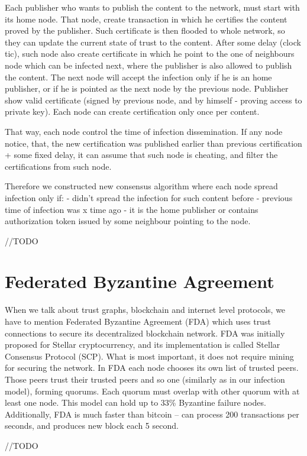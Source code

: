 \documentclass[nostrict]{szablonPG}
\begin{document}
Each publisher who wants to publish the content to the network, must start with its home node. That node, create transaction in which he certifies the content proved by the publisher. Such certificate is then flooded to whole network, so they can update the current state of trust to the content. After some delay (clock tic), such node also create certificate in which he point to the one of neighbours node which can be infected next, where the publisher is also allowed to publish the content. The next node will accept the infection only if he is an home publisher, or if he is pointed as the next node by the previous node. Publisher show valid certificate (signed by previous node, and by himself - proving access to private key). Each node can create certification only once per content. 

That way, each node control the time of infection dissemination. If any node notice, that, the new certification was published earlier than previous certification + some fixed delay, it can assume that such node is cheating, and filter the certifications from such node.

Therefore we constructed new consensus algorithm where each node spread infection only if:
- didn't spread the infection for such content before
- previous time of infection was x time ago
- it is the home publisher or contains authorization token issued by some neighbour pointing to the node.

//TODO

\section{Federated Byzantine Agreement}
When we talk about trust graphs, blockchain and internet level protocols, we have to mention Federated Byzantine Agreement (FDA) which uses trust connections to secure its decentralized blockchain network. FDA was initially proposed for Stellar cryptocurrency, and its implementation is called Stellar Consensus Protocol (SCP). What is most important, it does not require mining for securing the network. In FDA each node chooses its own list of trusted peers. Those peers trust their trusted peers and so one (similarly as in our infection model), forming quorums. Each quorum must overlap with other quorum with at least one node. This model can hold up to 33\% Byzantine failure nodes. Additionally, FDA is much faster than bitcoin -- can process 200 transactions per seconds, and produces new block each 5 second. 

//TODO
\end{document}
